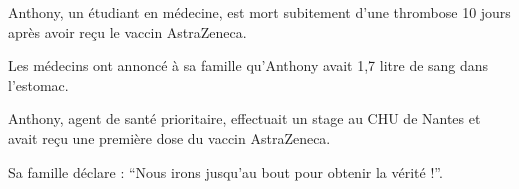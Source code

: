 Anthony, un étudiant en médecine, est mort subitement d'une thrombose 10 jours
après avoir reçu le vaccin AstraZeneca.

Les médecins ont annoncé à sa famille qu'Anthony avait 1,7 litre de sang dans
l'estomac.

Anthony, agent de santé prioritaire, effectuait un stage au CHU de Nantes et
avait reçu une première dose du vaccin AstraZeneca.

Sa famille déclare : “Nous irons jusqu'au bout pour obtenir la vérité !”.

